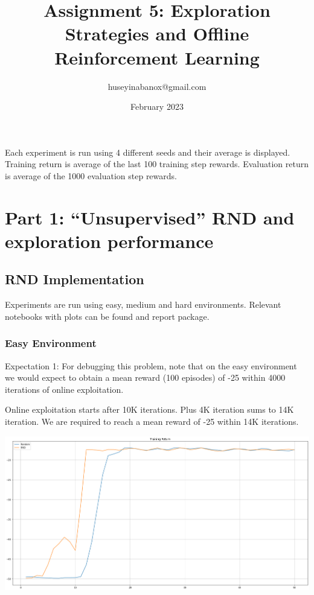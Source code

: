\documentclass[11pt]{article}
\title{Assignment 5: Exploration Strategies and Offline Reinforcement Learning}
\author{huseyinabanox@gmail.com}
\date{February 2023}
\begin{document}
    \maketitle

    Each experiment is run using 4 different seeds and their average is displayed.
    Training return is average of the last 100 training step rewards.
    Evaluation return is average of the 1000 evaluation step rewards.

    \section{Part 1: “Unsupervised” RND and exploration performance}

    \subsection{RND Implementation}

    Experiments are run using easy, medium and hard environments.
    Relevant notebooks with plots can be found and report package.

    \subsubsection{Easy Environment}

    Expectation 1: For debugging this problem, note that on the easy environment we would expect to obtain a mean reward (100 episodes) of -25 within 4000 iterations of online exploitation.

    Online exploitation starts after 10K iterations.
    Plus 4K iteration sums to 14K iteration.
    We are required to reach a mean reward of -25 within 14K iterations.

    \hspace*{-0.6in}
    \includegraphics[scale=0.30]{p1/q1-easy-train-compare}
\end{document}
